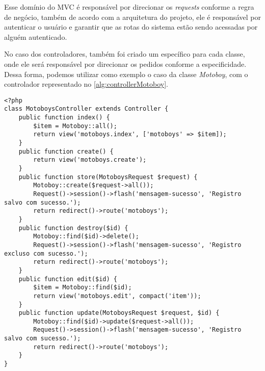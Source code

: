 Esse domínio do MVC é responsável por direcionar os \textit{requests} conforme a regra de negócio, também de acordo com a arquitetura do projeto, ele é responsável por autenticar o usuário e garantir que as rotas do sistema estão sendo acessadas por alguém autenticado. 

No caso dos controladores, também foi criado um específico para cada classe, onde ele será responsável por direcionar os pedidos conforme a especificidade. Dessa forma, podemos utilizar como exemplo o caso da classe \textit{Motoboy}, com o controlador representado no \autoref{alg:controllerMotoboy}.

\begin{lstlisting}[caption={Delivery Routes - Exemplo de um Controller: Motoboy}, style=htmlcssjs, label=alg:controllerMotoboy]
<?php
class MotoboysController extends Controller {
    public function index() {
        $item = Motoboy::all();
        return view('motoboys.index', ['motoboys' => $item]);
    }
    public function create() {
        return view('motoboys.create');
    }
    public function store(MotoboysRequest $request) {
        Motoboy::create($request->all());
        Request()->session()->flash('mensagem-sucesso', 'Registro salvo com sucesso.');
        return redirect()->route('motoboys');
    }
    public function destroy($id) {
        Motoboy::find($id)->delete();
        Request()->session()->flash('mensagem-sucesso', 'Registro excluso com sucesso.');
        return redirect()->route('motoboys');
    }
    public function edit($id) {
        $item = Motoboy::find($id);
        return view('motoboys.edit', compact('item'));
    }
    public function update(MotoboysRequest $request, $id) {
        Motoboy::find($id)->update($request->all());
        Request()->session()->flash('mensagem-sucesso', 'Registro salvo com sucesso.');
        return redirect()->route('motoboys');
    }
}
\end{lstlisting}

